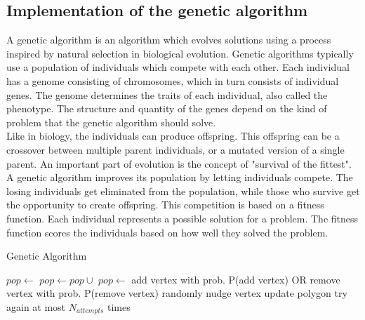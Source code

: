 \subsection{Implementation of the genetic algorithm}
A genetic algorithm is an algorithm which evolves solutions using a process inspired by natural selection in biological evolution. Genetic algorithms typically use a population of individuals which compete with each other. Each individual has a genome consisting of chromosomes, which in turn consists of individual genes. The genome determines the traits of each individual, also called the phenotype. The structure and quantity of the genes depend on the kind of problem that the genetic algorithm should solve. \\
Like in biology, the individuals can produce offspring. This offspring can be a crossover between multiple parent individuals, or a mutated version of a single parent. An important part of evolution is the concept of "survival of the fittest". A genetic algorithm improves its population by letting individuals compete. The losing individuals get eliminated from the population, while those who survive get the opportunity to create offspring. This competition is based on a fitness function. Each individual represents a possible solution for a problem. The fitness function scores the individuals based on how well they solved the problem.

\begin{algorithm}
\caption{Genetic Algorithm}
\label{alg:ga}
\begin{algorithmic}[1]
\State $pop \leftarrow $ 
\State $pop \leftarrow pop \cup $ 
\State {}
\State $pop \leftarrow $ 
\EndFor
\Return {}
\EndFunction
{}
\State add vertex with prob. P(add vertex)
\State OR remove vertex with prob. P(remove vertex)
\State randomly nudge  vertex
\State update polygon
\Else
\State try again at most $N_{attempts}$ times
\EndIf
\EndFor
\EndFor
\Return {}
\EndFunction
\end{algorithmic}
\end{algorithm}

